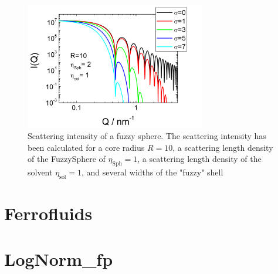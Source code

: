 \begin{figure}[htb]
\begin{center}
\includegraphics[width=0.7\textwidth,height=0.5\textwidth]{../images/form_factor/FuzzySphere/FuzzySphereIQ.png}
\end{center}
\caption{Scattering intensity of a fuzzy sphere. The scattering
intensity has been calculated for a core radius $R=10$, a
scattering length density of the FuzzySphere of
$\eta_\text{Sph}=1$, a scattering length density of the solvent
$\eta_\text{sol}=1$, and several widths of the "fuzzy" shell}
\label{fig:I_FuzzySphere}
\end{figure}


\clearpage
\section{Ferrofluids} \hspace{1pt}
\label{sec:ferrofluid}

\clearpage
\section{LogNorm\_fp} \hspace{1pt}
\label{sec:sd_lognorm_fp}

